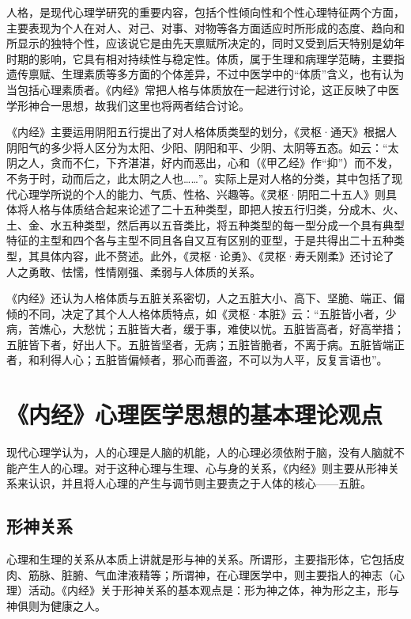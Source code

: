\documentclass[12pt]{ctexbook}
\begin{document}
人格，是现代心理学研究的重要内容，包括个性倾向性和个性心理特征两个方面，主要表现为个人在对人、对己、对事、对物等各方面适应时所形成的态度、趋向和所显示的独特个性，应该说它是由先天禀赋所决定的，同时又受到后天特别是幼年时期的影响，它具有相对持续性与稳定性。体质，属于生理和病理学范畴，主要指遗传禀赋、生理素质等多方面的个体差异，不过中医学中的“体质”含义，也有认为当包括心理素质者。《内经》常把人格与体质放在一起进行讨论，这正反映了中医学形神合一思想，故我们这里也将两者结合讨论。

《内经》主要运用阴阳五行提出了对人格体质类型的划分，《灵枢·通天》根据人阴阳气的多少将人区分为太阳、少阳、阴阳和平、少阴、太阴等五态。如云：“太阴之人，贪而不仁，下齐湛湛，好内而恶出，心和（《甲乙经》作“抑”）而不发，不务于时，动而后之，此太阴之人也……”。实际上是对人格的分类，其中包括了现代心理学所说的个人的能力、气质、性格、兴趣等。《灵枢·阴阳二十五人》则具体将人格与体质结合起来论述了二十五种类型，即把人按五行归类，分成木、火、土、金、水五种类型，然后再以五音类比，将五种类型的每一型分成一个具有典型特征的主型和四个各与主型不同且各自又互有区别的亚型，于是共得出二十五种类型，其具体内容，此不赘述。此外，《灵枢·论勇》、《灵枢·寿夭刚柔》还讨论了人之勇敢、怯懦，性情刚强、柔弱与人体质的关系。

《内经》还认为人格体质与五脏关系密切，人之五脏大小、高下、坚脆、端正、偏倾的不同，决定了其个人人格体质特点，如《灵枢·本脏》云：“五脏皆小者，少病，苦燋心，大愁忧；五脏皆大者，缓于事，难使以忧。五脏皆高者，好高举措；五脏皆下者，好出人下。五脏皆坚者，无病；五脏皆脆者，不离于病。五脏皆端正者，和利得人心；五脏皆偏倾者，邪心而善盗，不可以为人平，反复言语也”。

\section{《内经》心理医学思想的基本理论观点}%

现代心理学认为，人的心理是人脑的机能，人的心理必须依附于脑，没有人脑就不能产生人的心理。对于这种心理与生理、心与身的关系，《内经》则主要从形神关系来认识，并且将人心理的产生与调节则主要责之于人体的核心——五脏。

\subsection{形神关系}%

心理和生理的关系从本质上讲就是形与神的关系。所谓形，主要指形体，它包括皮肉、筋脉、脏腑、气血津液精等；所谓神，在心理医学中，则主要指人的神志（心理）活动。《内经》关于形神关系的基本观点是：形为神之体，神为形之主，形与神俱则为健康之人。
\end{document}

